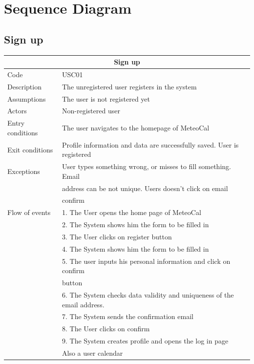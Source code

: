 \documentclass[12pt]{book}
\begin{document}
\section{Sequence Diagram}
\subsection{Sign up}
\begin{center}
\vspace*{\fill}
\begin{tabular}{ |l|l| }
  		\hline
  		\hline
  		\multicolumn{2}{|c|}{\large{\textbf{Sign up}}} \\
  		\hline
  		\hline
  		Code  & USC01\\ 
		\hline
		Description & The unregistered user registers in the system\\
		\hline
		Assumptions & The user is not registered yet\\
		\hline
		Actors & Non-registered user\\
		\hline
		Entry conditions & The user navigates to the homepage of MeteoCal\\
		\hline
		Exit conditions & Profile information and data are successfully saved. User is registered\\
		\hline
		Exceptions & User types something wrong, or misses to fill something. Email \\& address can be not unique. Users doesn't click on email\\& confirm\\
		\hline
		Flow of events & 
			1. The User opens the home page of MeteoCal \\&
			2. The System shows him the form to be filled in \\&
			3. The User clicks on register button\\&
			4. The System shows him the form to be filled in\\&
			5. The user inputs his personal information and click on confirm\\& button\\&
			6. The System checks data validity and uniqueness of the email address. \\&
			7. The System sends the confirmation email\\&
			8. The User clicks on confirm\\&
			9. The System creates profile and opens the log in page \\& Also a user calendar \\
  		\hline 

\end{tabular}
\end{center}
\end{document}
